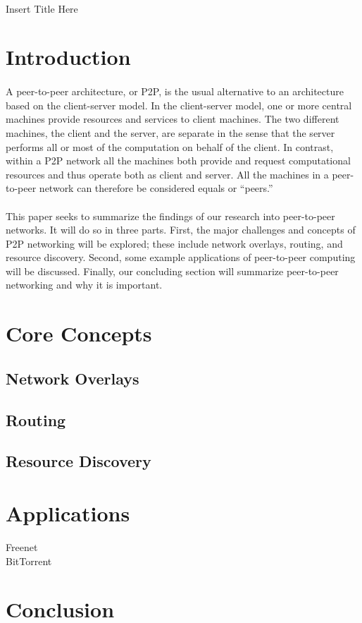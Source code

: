 \documentclass[12pt,letterpaper]{article}
\begin{document}
\onehalfspacing

\paragraph{}
\begin{center}
\Large Insert Title Here
\end{center}

\section{Introduction}

\paragraph{}

A peer-to-peer architecture, or P2P, is the usual alternative to an architecture based on the client-server model. In the client-server model, one or more central machines provide resources and services to client machines. The two different machines, the client and the server, are separate in the sense that the server performs all or most of the computation on behalf of the client. In contrast, within a P2P network all the machines both provide and request computational resources and thus operate both as client and server. All the machines in a peer-to-peer network can therefore be considered equals or ``peers.''

\paragraph{}

This paper seeks to summarize the findings of our research into peer-to-peer networks. It will do so in three parts. First, the major challenges and concepts of P2P networking will be explored; these include network overlays, routing, and resource discovery. Second, some example applications of peer-to-peer computing will be discussed. Finally, our concluding section will summarize peer-to-peer networking and why it is important.


\section{Core Concepts}

\subsection{Network Overlays}

\subsection{Routing}

\subsection{Resource Discovery}

\section{Applications}

Freenet\\
BitTorrent\\

\section{Conclusion}
\end{document}
